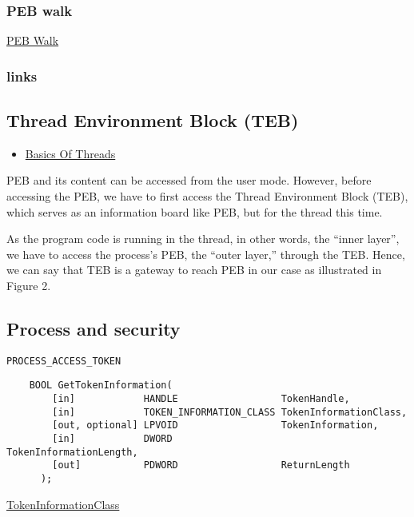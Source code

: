\subsubsection{PEB walk}

\href{https://fareedfauzi.github.io/2024/07/13/PEB-Walk.html}{PEB Walk}

\subsubsection{links}


\subsection{Thread Environment Block (TEB)}

\begin{itemize}
    \item \href{https://github.com/Faran-17/Windows-Internals/blob/main/Threads/1.%20Basics%20Of%20Threads.md}{Basics Of Threads}
\end{itemize}

PEB and its content can be accessed from the user mode. However, before accessing the PEB, we have to first access the Thread Environment Block (TEB), which serves as an information board like PEB, but for the thread this time.

As the program code is running in the thread, in other words, the “inner layer”, we have to access the process’s PEB, the “outer layer,” through the TEB. Hence, we can say that TEB is a gateway to reach PEB in our case as illustrated in Figure 2.

\subsection{Process and security}

\verb+PROCESS_ACCESS_TOKEN+

\begin{verbatim}
    BOOL GetTokenInformation(
        [in]            HANDLE                  TokenHandle,
        [in]            TOKEN_INFORMATION_CLASS TokenInformationClass,
        [out, optional] LPVOID                  TokenInformation,
        [in]            DWORD                   TokenInformationLength,
        [out]           PDWORD                  ReturnLength
      );
\end{verbatim}

\href{https://learn.microsoft.com/fr-fr/windows/win32/api/winnt/ne-winnt-token_information_class}{TokenInformationClass}

